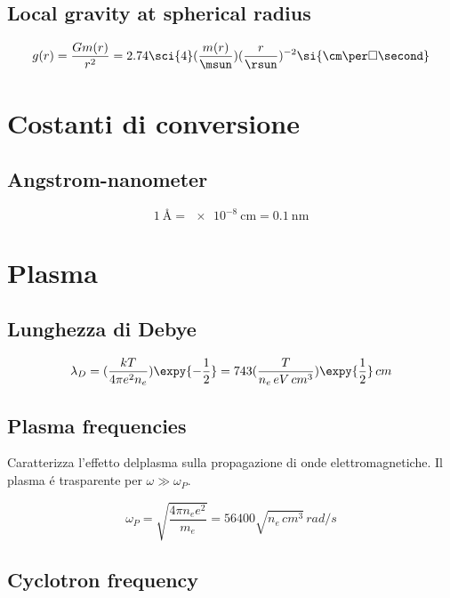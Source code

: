 \subsection{Local gravity at spherical radius}
\begin{equation*}
g(r)=\frac{Gm(r)}{r^2}=2.74\sci{4}(\frac{m(r)}{\msun})(\frac{r}{\rsun})^{-2}\si{\cm\per\square\second}
\end{equation*}


\section{Costanti di conversione}

\subsection{Angstrom-nanometer}
\begin{equation*}
\SI{1}{\angstrom}=\SI{e-8}{\cm}=\SI{0.1}{\nano\meter}
\end{equation*}

\section{Plasma}

\subsection{Lunghezza di Debye}

\begin{equation*}
\lambda_D=(\frac{kT}{4\pi e^2n_e})\expy{-\frac{1}{2}}=743(\frac{T}{n_e\,eV\,cm^3})\expy{\frac{1}{2}}\,cm
\end{equation*}

\subsection{Plasma frequencies}
Caratterizza l'effetto delplasma sulla propagazione di onde elettromagnetiche. Il plasma \'e trasparente per $\omega\gg\omega_P$.

\begin{equation*}
\omega_P=\sqrt{\frac{4\pi n_ee^2}{m_e}}=56400\sqrt{n_e\,cm^3}\,rad/s
\end{equation*}

\subsection{Cyclotron frequency}

